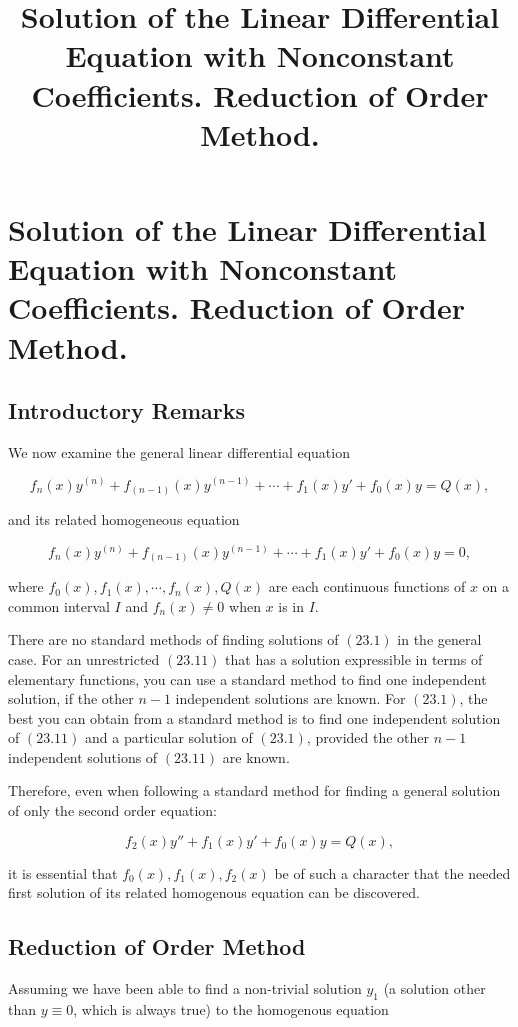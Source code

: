 \documentclass{article}
\title{Solution of the Linear Differential Equation with Nonconstant Coefficients. Reduction of Order Method.}
\begin{document}
\section{Solution of the Linear Differential Equation with Nonconstant Coefficients. Reduction of Order Method.}

\subsection{Introductory Remarks}

We now examine the general linear differential equation

\[ \tag{23.1} f_n(x)y^{(n)} + f_{(n-1)}(x)y^{(n-1)} + \cdots + f_1(x)y' + f_0(x)y = Q(x), \]

and its related homogeneous equation

\[ \tag{23.11} f_n(x)y^{(n)} + f_{(n-1)}(x)y^{(n-1)} + \cdots + f_1(x)y' + f_0(x)y = 0, \]

where $f_0(x),f_1(x),\cdots,f_n(x),Q(x)$ are each \@{continuous} functions of $x$ on a common interval $I$ and $f_n(x) \neq 0$ when $x$ is in $I$.

There are no standard methods of finding solutions of $(23.1)$ in the general case. For an unrestricted $(23.11)$ that has a solution expressible in terms of elementary functions, you can use a standard method to find one independent solution, if the other $n - 1$ independent solutions are known. For $(23.1)$, the best you can obtain from a standard method is to find one independent solution of $(23.11)$ and a particular solution of $(23.1)$, provided the other $n - 1$ independent solutions of $(23.11)$ are known. 

Therefore, even when following a standard method for finding a general solution of only the second order equation:

\[ \tag{23.12} f_2(x)y'' + f_1(x)y' + f_0(x)y = Q(x), \]

it is essential that $f_0(x), f_1(x), f_2(x)$ be of such a character that the needed first solution of its related homogenous equation can be discovered.

\subsection{Reduction of Order Method}

Assuming we have been able to find a non-trivial solution $y_1$ (a solution other than $y \equiv 0$, which is always true) to the homogenous equation
\end{document}
